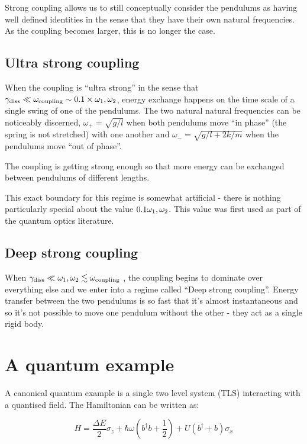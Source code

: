 \documentclass[
]{article}
\renewcommand{\[}{\begin{equation}}
\renewcommand{\]}{\end{equation}}
\begin{document}
Strong coupling allows us to still conceptually consider the pendulums
as having well defined identities in the sense that they have their own
natural frequencies. As the coupling becomes larger, this is no longer
the case.

\subsection{Ultra strong coupling}\label{ultra-strong-coupling}

When the coupling is ``ultra strong'' in the sense that
\(\gamma_{\rm diss} \ll \omega_{\rm coupling} \sim 0.1\times  \omega_1,\omega_2\),
energy exchange happens on the time scale of a single swing of one of
the pendulums. The two natural natural frequencies can be noticeably
discerned, \(\omega_+ = \sqrt{g/l}\) when both pendulums move ``in
phase'' (the spring is not stretched) with one another and
\(\omega_- = \sqrt{g/l + 2k/m}\) when the pendulums move ``out of
phase''.

The coupling is getting strong enough so that more energy can be
exchanged between pendulums of different lengths.

This exact boundary for this regime is somewhat artificial - there is
nothing particularly special about the value
\(0.1 \omega_{\rm 1}, \omega_2\). This value was first used as part of
the quantum optics literature.

\subsection{Deep strong coupling}\label{deep-strong-coupling}

When
\(\gamma_{\rm diss} \ll \omega_1,\omega_2 \lesssim \omega_{\rm coupling}\)
, the coupling begins to dominate over everything else and we enter into
a regime called ``Deep strong coupling''. Energy transfer between the
two pendulums is so fast that it's almost instantaneous and so it's not
possible to move one pendulum without the other - they act as a single
rigid body.

\section{A quantum example}\label{a-quantum-example}

A canonical quantum example is a single two level system (TLS)
interacting with a quantised field. The Hamiltonian can be written as:

\[
H = \frac{\Delta E}{2} \sigma_z + \hbar\omega\left(b^{\dagger}b +\frac{1}{2}\right) + U\left( b^{\dagger} + b \right)\sigma_x
\label{eq:H}
\]
\end{document}
